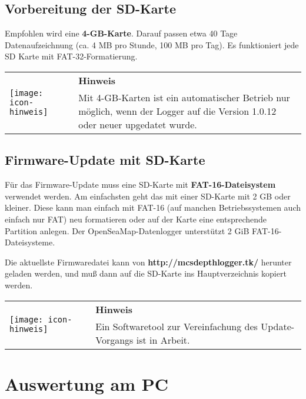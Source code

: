 \documentclass[pdftex, fontsize=8pt, paper=130mm:92mm,pagesize]{scrartcl}
\let\stdsection\section
\renewcommand\section{\newpage\stdsection}
\newlength{\iconwidth}
\newenvironment{displaybox}[2]{%
  \begin{center}
    \setlength\arrayrulewidth{0.75pt}%
    \arrayrulecolor{white}%
    \renewcommand{\arraystretch}{1.3}%
    \begin{tabular}{p{\iconwidth}p{\linewidth-4\tabcolsep-\iconwidth}}
      \multirow{2}{*}{#2}&\cellcolor{boxheadcol}\textbf{\color{white}#1} \\%
      \hhline{~-}%
      &\cellcolor{boxcol}%
}{%
      \\
    \end{tabular}
  \end{center}%
\arrayrulecolor{black}
}
\newenvironment{Hinweis}{%
\begin{displaybox}{Hinweis}{\texttt{[image: icon-hinweis]}}}%
{\end{displaybox}}
\begin{document}
\subsection{Vorbereitung der SD-Karte}

Empfohlen wird eine \textbf{4-GB-Karte}. Darauf passen etwa 40 Tage Datenaufzeichnung (ca. 4 MB pro Stunde, 100 MB pro Tag). Es funktioniert jede SD Karte mit FAT-32-Formatierung. 

\begin{Hinweis}
Mit 4-GB-Karten ist ein automatischer Betrieb nur möglich, wenn der Logger auf die Version 1.0.12 oder neuer upgedatet wurde.
\end{Hinweis}

\subsection{Firmware-Update mit SD-Karte}\label{sec:firmware}

Für das Firmware-Update muss eine SD-Karte mit \textbf{FAT-16-Dateisystem} verwendet werden. Am einfachsten geht das mit einer SD-Karte mit 2 GB oder kleiner. Diese kann man einfach mit FAT-16 (auf manchen Betriebssystemen auch einfach nur FAT) neu formatieren oder auf der Karte eine entsprechende Partition anlegen. Der OpenSeaMap-Datenlogger unterstützt 2 GiB FAT-16-Dateisysteme. 

Die aktuellste Firmwaredatei kann von \textbf{http://mcsdepthlogger.tk/} herunter geladen werden, und muß dann auf die SD-Karte ins Hauptverzeichnis kopiert werden.

\begin{Hinweis}
Ein Softwaretool zur Vereinfachung des Update-Vorgangs ist in Arbeit. 
\end{Hinweis}

\section{Auswertung am PC}
\end{document}
